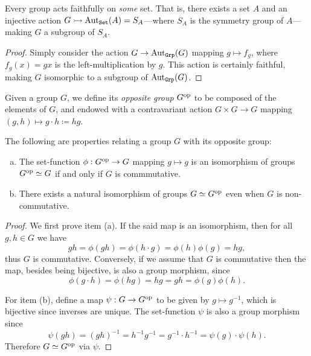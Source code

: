 \begin{theorem}[Cayley]
    \label{thm:cayley-faithful}
    Every group acts faithfully on \emph{some} set. That is, there exists a set
    \(A\) and an injective action \(G \rightarrowtail \operatorname{Aut}_{{\texttt{Set}}}(A) = S_A\)---where \(S_A\)
    is the symmetry group of \(A\)---making \(G\) a subgroup of \(S_A\).
\end{theorem}

\begin{proof}
    Simply consider the action \(G \to \operatorname{Aut}_{{\texttt{Grp}}}(G)\) mapping \(g \mapsto f_g\),
    where \(f_g(x) = g x\) is the left-multiplication by \(g\). This action is
    certainly faithful, making \(G\) isomorphic to a subgroup of \(\operatorname{Aut}_{{\texttt{Grp}}}(G)\).
\end{proof}

\begin{definition}
    \label{def:opposite-group}
    Given a group \(G\), we define its \emph{opposite group} \(G^{\mathrm{op}}\) to be
    composed of the elements of \(G\), and endowed with a contravariant action \(G
    \times G \to G\) mapping \((g, h) \mapsto g \cdot h \coloneq h g\).
\end{definition}

\begin{corollary}
    \label{cor:Gop-iso-G-id-iff-commutative}
    The following are properties relating a group \(G\) with its opposite group:
    \begin{enumerate}[(a)]\setlength\itemsep{0em}
        \item The set-function \(\phi: G^{\mathrm{op}} \to G\) mapping \(g \mapsto g\) is an
              isomorphism of groups \(G^{\mathrm{op}} \simeq G\) if and only if \(G\) is commmutative.

        \item There exists a natural isomorphism of groups \(G \simeq G^{\mathrm{op}}\) even when
              \(G\) is non-commutative.
    \end{enumerate}
\end{corollary}

\begin{proof}
    We first prove item (a). If the said map is an isomorphism, then for all
    \(g, h \in G\) we have
    \[
        g h = \phi(g h) = \phi(h \cdot g) = \phi(h) \phi(g) = h g,
    \]
    thus \(G\) is commutative. Conversely, if we assume that \(G\) is commutative
    then the map, besides being bijective, is also a group morphism, since
    \[
        \phi(g \cdot h) = \phi(h g) = h g = g h = \phi(g) \phi(h).
    \]

    For item (b), define a map \(\psi: G \to G^{\mathrm{op}}\) to be given by
    \(g \mapsto g^{-1}\), which is bijective since inverses are unique. The
    set-function \(\psi\) is also a group morphism since
    \[
        \psi(g h) = (g h)^{-1} = h^{-1} g^{-1}
        = g^{-1} \cdot h^{-1} = \psi(g) \cdot \psi(h).
    \]
    Therefore \(G \simeq G^{\mathrm{op}}\) via \(\psi\).
\end{proof}

